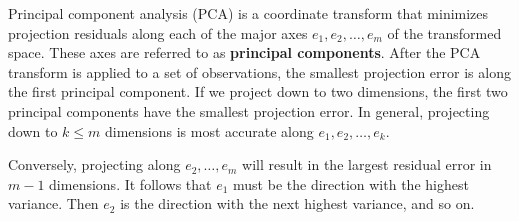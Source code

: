 Principal component analysis (PCA) is a coordinate transform that minimizes projection residuals along each of the major axes \(e_1, e_2, \dots, e_m\) of the transformed space.
These axes are referred to as \textbf{principal components}.
After the PCA transform is applied to a set of observations, the smallest projection error is along the first principal component.
If we project down to two dimensions, the first two principal components have the smallest projection error.
In general, projecting down to \(k \leq m\) dimensions is most accurate along \(e_1, e_2, \dots, e_k\).

Conversely, projecting along \(e_2, \dots, e_m\) will result in the largest residual error in \(m-1\) dimensions.
It follows that \(e_1\) must be the direction with the highest variance.
Then \(e_2\) is the direction with the next highest variance, and so on.

